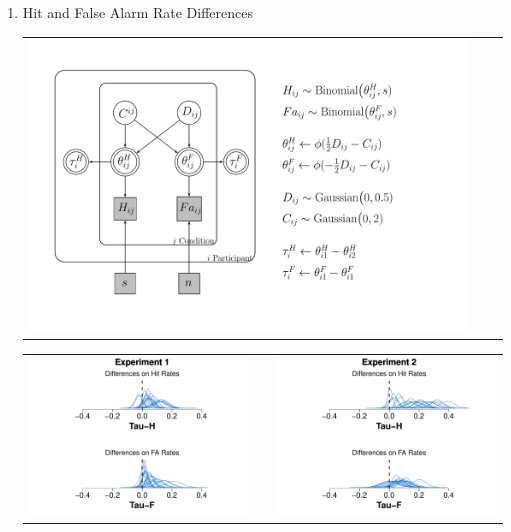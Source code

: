 \documentclass[final]{beamer}
\newlength{\onecolwid}
\newlength{\twocolwid}
\begin{document}
\begin{frame}[t]
\begin{columns}[t]
\begin{column}{\twocolwid}
\begin{columns}[t,totalwidth=\twocolwid]
\begin{column}{\onecolwid}
\begin{alertblock}{}
\begin{enumerate}
\item Hit and False Alarm Rate Differences
\begin{center}
\begin{tabular}{ccc}
\includegraphics[width=0.65\linewidth]{Figures/Tau_DiffTeta_Model3.pdf}
\end{tabular}


\begin{tabular}{ccc}
\includegraphics[width=0.48\linewidth]{Figures/Tau_1.pdf} & \hfill & \includegraphics[width=0.48\linewidth]{Figures/Tau_2.pdf}
\end{tabular}
\end{center}



$\quad$
\end{enumerate}


\end{alertblock}
\end{column}
\end{columns}
\end{column}
\end{columns}
\end{frame}
\end{document}
